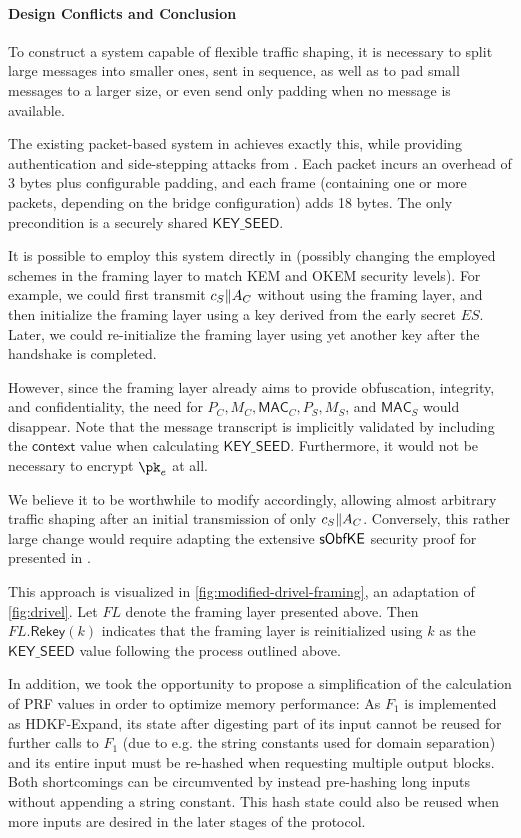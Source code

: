 \paragraph{Design Conflicts and Conclusion}

To construct a system capable of flexible traffic shaping, it is necessary to split large messages into smaller ones, sent in sequence, as well as to pad small messages to a larger size, or even send only padding when no message is available.

The existing packet-based system in \obfsfour{} achieves exactly this, while providing authentication and side-stepping attacks from \cite{SP:AlbPatWat09}. Each packet incurs an overhead of 3 bytes plus configurable padding, and each frame (containing one or more packets, depending on the bridge configuration) adds 18 bytes.
The only precondition is a securely shared $\mathsf{KEY\_SEED}$.

It is possible to employ this system directly in \drivel{} (possibly changing the employed schemes in the framing layer to match KEM and OKEM security levels).
For example, we could first transmit $c_S \| A_C$ without using the framing layer, and then initialize the framing layer using a key derived from the early secret $ES$. Later, we could re-initialize the framing layer using yet another key after the handshake is completed.

However, since the framing layer already aims to provide obfuscation, integrity, and confidentiality, the need for $P_C, M_C, \mathsf{MAC}_C, P_S, M_S$, and $\mathsf{MAC}_S$ would disappear. Note that the message transcript is implicitly validated by including the $\mathsf{context}$ value when calculating $\mathsf{KEY\_SEED}$. Furthermore, it would not be necessary to encrypt $\pk_e$ at all.

We believe it to be worthwhile to modify \drivel{} accordingly, allowing almost arbitrary traffic shaping after an initial transmission of only $c_S \| A_C$.
Conversely, this rather large change would require adapting the extensive $\mathsf{sObfKE}$ security proof for \drivel{} presented in \cite{EPRINT:GRSV25}.

This approach is visualized in \cref{fig:modified-drivel-framing}, an adaptation of \cref{fig:drivel}. Let $FL$ denote the framing layer presented above. Then $FL.\mathsf{Rekey}(k)$ indicates that the framing layer is reinitialized using $k$ as the $\mathsf{KEY\_SEED}$ value following the process outlined above.

In addition, we took the opportunity to propose a simplification of the calculation of PRF values in order to optimize memory performance:
As $F_1$ is implemented as \textsf{HDKF-Expand}, its state after digesting part of its input cannot be reused for further calls to $F_1$ (due to e.g. the string constants used for domain separation) and its entire input must be re-hashed when requesting multiple output blocks.
Both shortcomings can be circumvented by instead pre-hashing long inputs without appending a string constant. This hash state could also be reused when more inputs are desired in the later stages of the protocol.

